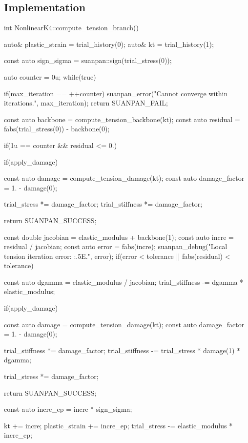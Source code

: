 \subsection{Implementation}
\begin{cppcode}
int NonlinearK4::compute_tension_branch() {
    auto& plastic_strain = trial_history(0);
    auto& kt = trial_history(1);

    const auto sign_sigma = suanpan::sign(trial_stress(0));

    auto counter = 0u;
    while(true) {
        if(max_iteration == ++counter) {
            suanpan_error("Cannot converge within {} iterations.\n", max_iteration);
            return SUANPAN_FAIL;
        }

        const auto backbone = compute_tension_backbone(kt);
        const auto residual = fabs(trial_stress(0)) - backbone(0);

        if(1u == counter && residual <= 0.) {
            if(apply_damage) {
                const auto damage = compute_tension_damage(kt);
                const auto damage_factor = 1. - damage(0);

                trial_stress *= damage_factor;
                trial_stiffness *= damage_factor;
            }

            return SUANPAN_SUCCESS;
        }

        const double jacobian = elastic_modulus + backbone(1);
        const auto incre = residual / jacobian;
        const auto error = fabs(incre);
        suanpan_debug("Local tension iteration error: {:.5E}.\n", error);
        if(error < tolerance || fabs(residual) < tolerance) {
            const auto dgamma = elastic_modulus / jacobian;
            trial_stiffness -= dgamma * elastic_modulus;

            if(apply_damage) {
                const auto damage = compute_tension_damage(kt);
                const auto damage_factor = 1. - damage(0);

                trial_stiffness *= damage_factor;
                trial_stiffness -= trial_stress * damage(1) * dgamma;

                trial_stress *= damage_factor;
            }

            return SUANPAN_SUCCESS;
        }

        const auto incre_ep = incre * sign_sigma;

        kt += incre;
        plastic_strain += incre_ep;
        trial_stress -= elastic_modulus * incre_ep;
    }
}


\end{cppcode}
